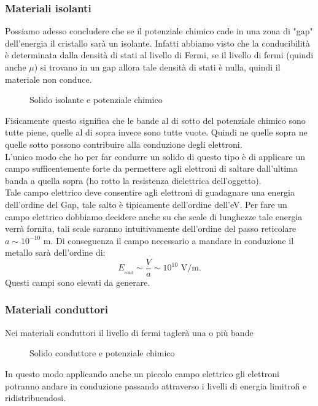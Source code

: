 \subsubsection{Materiali isolanti}
\label{subsubsec:Materiali isolanti}
Possiamo adesso concludere che se il potenziale chimico cade in una zona di "gap" dell'energia il cristallo sarà un isolante. Infatti abbiamo visto che la conducibilità è determinata dalla densità di stati al livello di Fermi, se il livello di fermi (quindi anche $\mu$) si trovano in un gap allora tale densità di stati è nulla, quindi il materiale non conduce. 
\begin{figure}[ht]
    \centering
    \caption{Solido isolante e potenziale chimico}
    \label{fig:solido-isolante-e-potenziale-chimico}
\end{figure}
Fisicamente questo significa che le bande al di sotto del potenziale chimico sono tutte piene, quelle al di sopra invece sono tutte vuote. Quindi ne quelle sopra ne quelle sotto possono contribuire alla conduzione degli elettroni. \\ 
L'unico modo che ho per far condurre un solido di questo tipo è di applicare un campo sufficentemente forte da permettere agli elettroni di saltare dall'ultima banda a quella sopra (ho rotto la resistenza dielettrica dell'oggetto). \\
Tale campo elettrico deve consentire agli elettroni di guadagnare una energia dell'ordine del Gap, tale salto è tipicamente dell'ordine dell'eV. Per fare un campo elettrico dobbiamo decidere anche su che scale di lunghezze tale energia verrà fornita, tali scale saranno intuitivamente dell'ordine del passo reticolare $a \sim 10^{-10}$ m. Di conseguenza il campo necessario a mandare in conduzione il metallo sarà dell'ordine di:
\[
	E_{_{\text{cond}}} \sim \frac{V}{a} \sim 10^{10} \text{ V/m}
.\] 
Questi campi sono elevati da generare.
\subsubsection{Materiali conduttori}
\label{subsubsec:Materiali conduttori}
Nei materiali conduttori il livello di fermi taglerà una o più bande
\begin{figure}[ht]
    \centering
    \caption{Solido conduttore e potenziale chimico}
    \label{fig:solido-conduttore-e-potenziale-chimico}
\end{figure}
In questo modo applicando anche un piccolo campo elettrico gli elettroni potranno andare in conduzione passando attraverso i livelli di energia limitrofi e ridistribuendosi.

